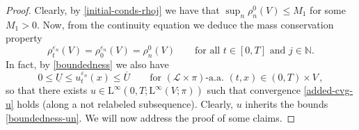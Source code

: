 \documentclass[11pt,reqno]{amsart}
\numberwithin{equation}{section}
\newcommand{\N}{\mathbb{N}}
\newcommand{\scrL}{\mathscr{L}}
\newcommand{\eps}{\varepsilon}
\theoremstyle{definition}
\newcommand{\ep}{\varepsilon}
\let\eps\ep
\newcommand{\ej}{\eps_n}
\newcommand{\rmL}{\mathrm{L}}
\newcommand{\RNEW}{\color{black}} %
\newcommand{\EEE}{\color{black}}
\numberwithin{equation}{section}
\begin{document}
\begin{proof}
Clearly, by \eqref{initial-conds-rhoj} we have that $\sup_n  \rho_n^0(V)  \leq M_1$ for some $M_1>0$. Now, 
from the continuity equation we deduce the mass conservation property
\[
\rho_t^{\ej}(V) = \rho_0^{\ej}(V) = \rho_n^0(V)  \qquad \text{for all } t \in [0,T] \text{ and } j \in \N.
\]
In fact,  \RNEW by \eqref{boundedness}  \EEE  we also have 
\begin{equation}
\label{boundedness-un}
0 \leq  \underline{U} \leq u_t^{\ej}(x) \leq \overline{U} \qquad \text{for } (\scrL{\times}\pi)\text{-a.a. } (t,x) \in (0,T){\times}V\,,
\end{equation}
\RNEW so that there exists $u \in   \rmL^\infty(0,T; \rmL^\infty(V; \pi))$  such that convergence \eqref{added-cvg-u} holds (along a not relabeled subsequence). 
Clearly, $u$ inherits the bounds \eqref{boundedness-un}.
\EEE
We will now address the proof of some claims. 
\medskip

\end{proof}
\end{document}
